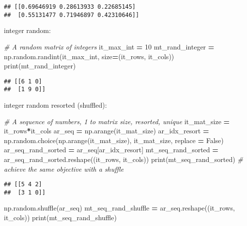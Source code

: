 \documentclass[
]{book}
\newenvironment{Shaded}{\begin{snugshade}}{\end{snugshade}}
\newcommand{\BuiltInTok}[1]{#1}
\newcommand{\CommentTok}[1]{\textcolor[rgb]{0.56,0.35,0.01}{\textit{#1}}}
\newcommand{\DecValTok}[1]{\textcolor[rgb]{0.00,0.00,0.81}{#1}}
\newcommand{\NormalTok}[1]{#1}
\newcommand{\OperatorTok}[1]{\textcolor[rgb]{0.81,0.36,0.00}{\textbf{#1}}}
\newcommand{\VariableTok}[1]{\textcolor[rgb]{0.00,0.00,0.00}{#1}}
\begin{document}
\begin{verbatim}
## [[0.69646919 0.28613933 0.22685145]
##  [0.55131477 0.71946897 0.42310646]]
\end{verbatim}

integer random:

\begin{Shaded}
\begin{Highlighting}[]
\CommentTok{\# A random matrix of integers}
\NormalTok{it\_max\_int }\OperatorTok{=} \DecValTok{10}
\NormalTok{mt\_rand\_integer }\OperatorTok{=}\NormalTok{ np.random.randint(it\_max\_int, size}\OperatorTok{=}\NormalTok{(it\_rows, it\_cols))}
\BuiltInTok{print}\NormalTok{(mt\_rand\_integer)}
\end{Highlighting}
\end{Shaded}

\begin{verbatim}
## [[6 1 0]
##  [1 9 0]]
\end{verbatim}

integer random resorted (shuffled):

\begin{Shaded}
\begin{Highlighting}[]
\CommentTok{\# A sequence of numbers, 1 to matrix size, resorted, unique}
\NormalTok{it\_mat\_size }\OperatorTok{=}\NormalTok{ it\_rows}\OperatorTok{*}\NormalTok{it\_cols}
\NormalTok{ar\_seq }\OperatorTok{=}\NormalTok{ np.arange(it\_mat\_size)}
\NormalTok{ar\_idx\_resort }\OperatorTok{=}\NormalTok{ np.random.choice(np.arange(it\_mat\_size), it\_mat\_size, replace }\OperatorTok{=} \VariableTok{False}\NormalTok{)}
\NormalTok{ar\_seq\_rand\_sorted }\OperatorTok{=}\NormalTok{ ar\_seq[ar\_idx\_resort]}
\NormalTok{mt\_seq\_rand\_sorted }\OperatorTok{=}\NormalTok{ ar\_seq\_rand\_sorted.reshape((it\_rows, it\_cols))}
\BuiltInTok{print}\NormalTok{(mt\_seq\_rand\_sorted)}
\CommentTok{\# achieve the same objective with a shuffle}
\end{Highlighting}
\end{Shaded}

\begin{verbatim}
## [[5 4 2]
##  [3 1 0]]
\end{verbatim}

\begin{Shaded}
\begin{Highlighting}[]
\NormalTok{np.random.shuffle(ar\_seq)}
\NormalTok{mt\_seq\_rand\_shuffle }\OperatorTok{=}\NormalTok{ ar\_seq.reshape((it\_rows, it\_cols))}
\BuiltInTok{print}\NormalTok{(mt\_seq\_rand\_shuffle)}
\end{Highlighting}
\end{Shaded}
\end{document}
